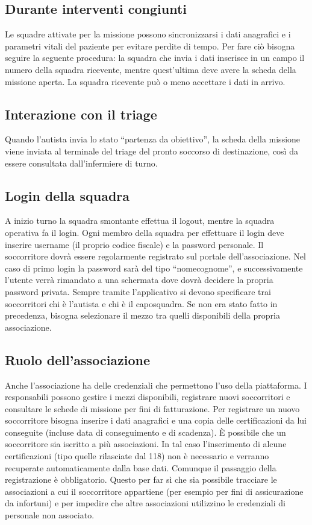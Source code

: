 \documentclass{article}
\begin{document}
    \subsection{Durante interventi congiunti}
    Le squadre attivate per la missione possono sincronizzarsi i dati anagrafici e i parametri vitali del paziente per evitare perdite di tempo. Per fare ciò bisogna seguire la seguente procedura: la squadra che invia i dati inserisce in un campo il numero della squadra ricevente, mentre quest’ultima deve avere la scheda della missione aperta. La squadra ricevente può o meno accettare i dati in arrivo.

    \subsection{Interazione con il triage}
    Quando l’autista invia lo stato “partenza da obiettivo”, la scheda della missione viene inviata al terminale del triage del pronto soccorso di destinazione, così da essere consultata dall’infermiere di turno.

    \subsection{Login della squadra}
    A inizio turno la squadra smontante effettua il logout, mentre la squadra operativa fa il login.
    Ogni membro della squadra per effettuare il login deve inserire username (il proprio codice fiscale) e la  password personale. Il soccorritore dovrà essere regolarmente registrato sul portale dell’associazione. Nel caso di primo login la password sarà del tipo “nomecognome”, e successivamente l’utente verrà rimandato a una schermata dove dovrà decidere la propria password privata.
    Sempre tramite l’applicativo si devono specificare trai soccorritori chi è l’autista e chi è il caposquadra.
    Se non era stato fatto in precedenza, bisogna selezionare il mezzo tra quelli disponibili della propria associazione.

    \subsection{Ruolo dell’associazione}
    Anche l’associazione ha delle credenziali che permettono l’uso della piattaforma. I responsabili possono gestire i mezzi disponibili, registrare nuovi soccorritori e consultare le schede di missione per fini di fatturazione.
    Per registrare un nuovo soccorritore bisogna inserire i dati anagrafici e una copia delle certificazioni da lui conseguite (incluse data di conseguimento e di scadenza).
    È possibile che un soccorritore sia iscritto a più associazioni. In tal caso l’inserimento di alcune certificazioni (tipo quelle rilasciate dal 118) non è necessario e verranno recuperate automaticamente dalla base dati.
    Comunque il passaggio della registrazione è obbligatorio. Questo per far sì che sia possibile tracciare le associazioni a cui il soccorritore appartiene (per esempio per fini di assicurazione da infortuni) e per impedire che altre associazioni utilizzino le credenziali di personale non associato.
\end{document}
